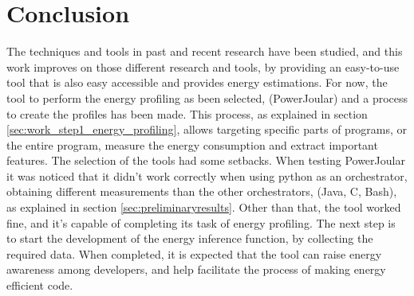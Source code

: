 
\chapter{Conclusion}\label{chapter:conclusion}

The techniques and tools in past and recent research have been studied, and this work improves on those different research and tools, by providing an easy-to-use tool that is also easy accessible and provides energy estimations.
For now, the tool to perform the energy profiling as been selected, (PowerJoular) and a process to create the profiles has been made. This process, as explained in section \ref{sec:work_step1_energy_profiling}, allows targeting specific parts of programs, or the entire program, measure the energy consumption and extract important features. The selection of the tools had some setbacks. When testing PowerJoular it was noticed that it didn't work correctly when using python as an orchestrator, obtaining different measurements than the other orchestrators, (Java, C, Bash), as explained in section \ref{sec:preliminaryresults}. Other than that, the tool worked fine, and it's capable of completing its task of energy profiling. The next step is to start the development of the energy inference function, by collecting the required data. When completed, it is expected that the tool can raise energy awareness among developers, and help facilitate the process of making energy efficient code.
